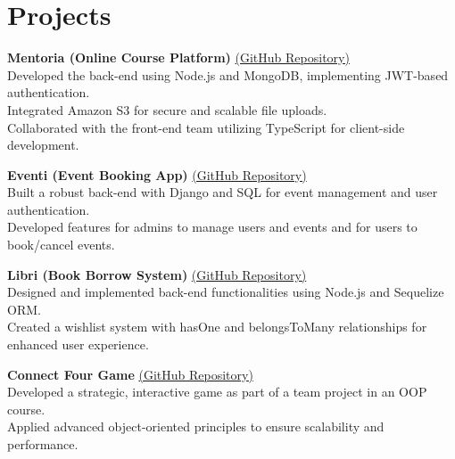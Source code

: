 \documentclass[a4paper,10pt]{article}
\begin{document}

\section*{Projects}
\textbf{Mentoria (Online Course Platform)} \href{https://github.com/YassenAli/Mentoria}{{(GitHub Repository)}}  \\      
\textbullet{}\hspace{2mm} Developed the back-end using Node.js and MongoDB, implementing JWT-based authentication.  \\  
\textbullet{}\hspace{2mm} Integrated Amazon S3 for secure and scalable file uploads.  \\  
\textbullet{}\hspace{2mm} Collaborated with the front-end team utilizing TypeScript for client-side development.  

\textbf{Eventi (Event Booking App)} \href{https://github.com/YassenAli/Event-System}{(GitHub Repository)}  \\
\textbullet{}\hspace{2mm} Built a robust back-end with Django and SQL for event management and user authentication.  \\
\textbullet{}\hspace{2mm} Developed features for admins to manage users and events and for users to book/cancel events.

\textbf{Libri (Book Borrow System)} \href{https://github.com/YassenAli/Libri}{(GitHub Repository)}  \\
\textbullet{}\hspace{2mm} Designed and implemented back-end functionalities using Node.js and Sequelize ORM.  \\
\textbullet{}\hspace{2mm} Created a wishlist system with hasOne and belongsToMany relationships for enhanced user experience.

\textbf{Connect Four Game} \href{https://github.com/YassenAli/XO-Game-by-CPP}{(GitHub Repository)}  \\
\textbullet{}\hspace{2mm} Developed a strategic, interactive game as part of a team project in an OOP course.  \\
\textbullet{}\hspace{2mm} Applied advanced object-oriented principles to ensure scalability and performance.
\end{document}
